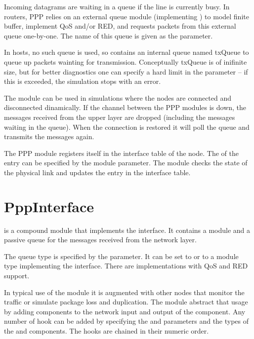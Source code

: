 Incoming datagrams are waiting in a queue if the line is currently busy.
In routers, PPP relies on an external queue module (implementing
) to model finite buffer, implement QoS and/or RED,
and requests packets from this external queue one-by-one. The name
of this queue is given as the  parameter.

In hosts, no such queue is used, so  contains an internal
queue named txQueue to queue up packets wainting for transmission.
Conceptually txQueue is of inifinite size, but for better diagnostics
one can specify a hard limit in the  parameter -- if
this is exceeded, the simulation stops with an error.

The module can be used in simulations where the nodes are connected and
disconnected dinamically. If the channel between the PPP modules is down,
the messages received from the upper layer are dropped (including the messages
waiting in the queue). When the connection is restored it will
poll the queue and transmits the messages again.

The PPP module registers itself in the interface table of the node.
The  of the entry can be specified by the
 module parameter. The module checks the state of the physical link
and updates the entry in the interface table.

\section{PppInterface}

 is a compound module that implements the 
 interface. It contains a  
module and a passive queue for the messages received from the network layer.

The queue type is specified by the  parameter.
It can be set to  or to a module type implementing
the  interface. There are implementations
with QoS and RED support.

In typical use of the  module it is augmented with other nodes
that monitor the traffic or simulate package loss and duplication.
The  module abstract that usage by adding
 components to the network input and output of the
 component. Any number of hook can be added by
specifying the  and 
parameters and the types of the  and 
components. The hooks are chained in their numeric order.




